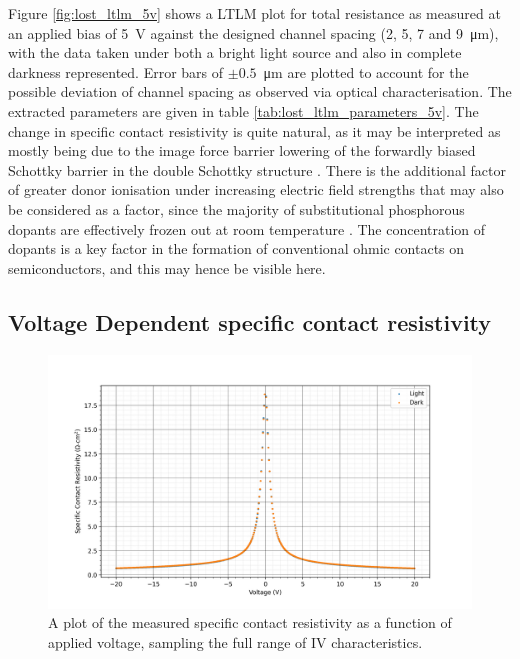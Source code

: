 \begin{refsection}
Figure \ref{fig:lost_ltlm_5v} shows a LTLM plot for total resistance as measured at an applied bias of 5~\si{\volt} against the designed channel spacing (2, 5, 7 and 9~\si{\micro\metre}), with the data taken under both a bright light source and also in complete darkness represented. Error bars of  $\pm0.5$~\si{\micro\metre} are plotted to account for the possible deviation of channel spacing as observed via optical characterisation. The extracted parameters are given in table \ref{tab:lost_ltlm_parameters_5v}. The change in specific contact resistivity is quite natural, as it may be interpreted as mostly being due to the image force barrier lowering of the forwardly biased Schottky barrier in the double Schottky structure \cite{sze2006, Aubry1994}. There is the additional factor of greater donor ionisation under increasing electric field strengths that may also be considered as a factor, since the majority of substitutional phosphorous dopants are effectively frozen out at room temperature \cite{koizumi1997, Donato2018, donato2019}. The concentration of dopants is a key factor in the formation of conventional ohmic contacts on semiconductors, and this may hence be visible here.

\subsection{Voltage Dependent specific contact resistivity}

\begin{figure}[H]
    \centering
    \includegraphics[width=\linewidth]{Chapter7/Figs/Raster/Lost Data/LTLM_rhoc_plot.png}
    \caption{A plot of the measured specific contact resistivity as a function of applied voltage, sampling the full range of IV characteristics.}
    \label{fig:lost_ltlm_rhoc}
\end{figure}


\end{refsection}
